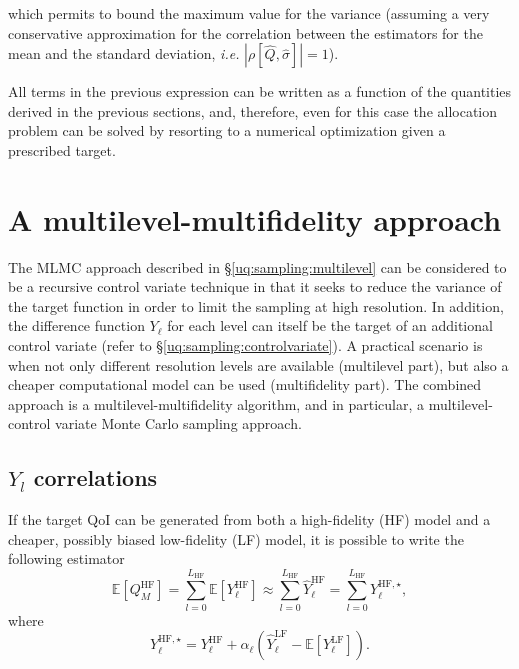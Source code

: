 which permits to bound the maximum value for the variance (assuming a very conservative approximation for the correlation between the estimators for the mean and the standard deviation, \textit{i.e.} $\left|\rho\left[\hat{Q},\hat{\sigma}\right]\right|=1$).

All terms in the previous expression can be written as a function of the quantities derived in the previous sections, and, therefore, even for this case the allocation problem can be solved by resorting to a numerical optimization given a prescribed target.

\section{A multilevel-multifidelity approach} \label{uq:sampling:mlmf}

The MLMC approach described in \S\ref{uq:sampling:multilevel} can be considered
to be a recursive control variate technique in that it seeks to reduce
the variance of the target function in order to limit the sampling at
high resolution. In addition, the difference function $Y_\ell$ for
each level can itself be the target of an additional control variate
(refer to \S\ref{uq:sampling:controlvariate}). A practical scenario is
when not only different resolution levels are available (multilevel
part), but also a cheaper computational model can be used
(multifidelity part). The combined approach is a
multilevel-multifidelity algorithm, and in particular, a
multilevel-control variate Monte Carlo sampling approach.

\subsection{$Y_l$ correlations} \label{uq:sampling:mlmf:Ycorr}

If the target QoI can be generated from both a high-fidelity (HF) model 
and a cheaper, possibly biased low-fidelity (LF) model, it is possible 
to write the following estimator
\begin{equation}\label{EQ: MLMF estimator}
 \mathbb{E}\left[Q_M^{\mathrm{HF}}\right] = \sum_{l=0}^{L_{\mathrm{HF}}} \mathbb{E}\left[Y^{\mathrm{HF}}_{\ell}\right] 
                                          \approx \sum_{l=0}^{L_{\mathrm{HF}}} \hat{Y}^{\mathrm{HF}}_{\ell} = \sum_{l=0}^{L_{\mathrm{HF}}} Y^{{\mathrm{HF}},\star}_{\ell},
\end{equation}
where
\begin{equation}
 Y^{{\mathrm{HF}},\star}_{\ell} = Y^{\mathrm{HF}}_{\ell} + \alpha_\ell \left( \hat{Y}^{\mathrm{LF}}_{\ell} - \mathbb{E}\left[{Y^{\mathrm{LF}}_{\ell}}\right] \right).
\end{equation}

